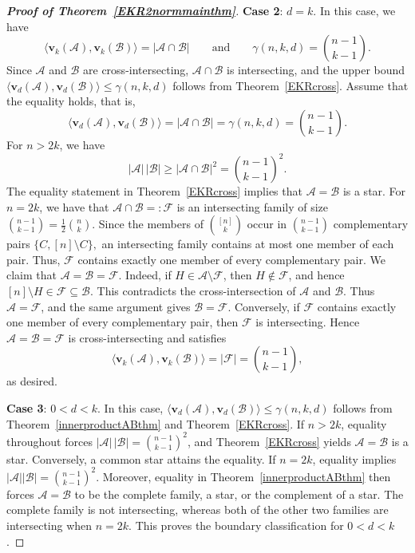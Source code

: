 \documentclass[10pt,a4paper]{amsart}
\numberwithin{equation}{section}
\def\A{\mathcal{A}}
\def\B{\mathcal{B}}
\def\F{\mathcal{F}}
\def\v{\mathbf{v}}
\begin{document}
\begin{proof}[{\bf Proof of Theorem~\ref{EKR2normmainthm}}]
{\bf Case 2}: $d=k$.
In this case, we have
\[
\big\langle\mathbf{v}_k(\mathcal{A}),
\mathbf{v}_k(\mathcal{B})\big\rangle
=|\mathcal{A}\cap\mathcal{B}|
\qquad\text{and}\qquad
\gamma(n,k,d)=\binom{n-1}{k-1}.
\]
Since $\mathcal{A}$ and $\mathcal{B}$ are cross-intersecting,
$\mathcal{A}\cap\mathcal{B}$ is intersecting, and the upper bound $\big\langle\mathbf{v}_{d}(\A),\mathbf{v}_{d}(\B)\big\rangle
\leq \gamma(n,k,d)$
follows from Theorem~\ref{EKRcross}.
Assume that the equality holds, that is,
$$\big\langle\mathbf{v}_{d}(\A),\mathbf{v}_{d}(\B)\big\rangle
=|\mathcal{A}\cap\mathcal{B}|= \gamma(n,k,d)=\binom{n-1}{k-1}.$$
For $n>2k$, we have
\[
|\mathcal{A}|\,|\mathcal{B}|
\geq|\mathcal{A}\cap\mathcal{B}|^2
=\binom{n-1}{k-1}^2.
\]
The equality statement in Theorem~\ref{EKRcross} implies that
$\mathcal{A}=\mathcal{B}$ is a star.
For $n=2k$, we have that
$\mathcal A\cap\mathcal B=:\mathcal F$ is an intersecting family of
size $\binom{n-1}{k-1}= \frac{1}{2}\binom{n}{k}$.
Since the members of $\binom{[n]}{k}$ occur in $\binom{n-1}{k-1}$ complementary pairs
$
 \{C,[n]\setminus C\},
$
an intersecting family contains at most one member of each pair.
Thus, $\F$ contains exactly one member of every complementary pair.
We claim that $\A=\B=\F$.  Indeed, if
$H\in\A\setminus\F$, then $H\notin\F$, and hence
$[n]\setminus H\in\F\subseteq\B$.  This contradicts the
cross-intersection of $\A$ and $\B$.  Thus $\A=\F$, and the same
argument gives $\B=\F$.
Conversely, if $\F$ contains exactly one member of every
complementary pair, then $\F$ is intersecting.
Hence
$\A=\B=\F$ is cross-intersecting and satisfies
\[
 \big\langle\v_k(\A),\v_k(\B)\big\rangle
 =|\F|=\binom{n-1}{k-1},
\]
as desired.

{\bf Case 3}: $0<d<k$.
In this case,
$\big\langle\mathbf{v}_d(\mathcal{A}),
\mathbf{v}_d(\mathcal{B})\big\rangle
\leq \gamma(n,k,d)$ follows from Theorem~\ref{innerproductABthm} and Theorem~\ref{EKRcross}.
If $n>2k$, equality throughout forces
$|\mathcal{A}|\,|\mathcal{B}|=\binom{n-1}{k-1}^2$, and
Theorem~\ref{EKRcross} yields $\mathcal{A}=\mathcal{B}$ is a star.
Conversely, a common star attains the equality.
If $n=2k$, equality implies
$|\mathcal A||\mathcal B|=\binom{n-1}{k-1}^2$.
Moreover, equality in Theorem~\ref{innerproductABthm} then forces
$\mathcal A=\mathcal B$ to be the complete family, a star, or the
complement of a star.
The complete family is not intersecting, whereas both of the other two families are intersecting when $n=2k$.
This proves the boundary classification for $0<d<k$.




\end{proof}
\end{document}
